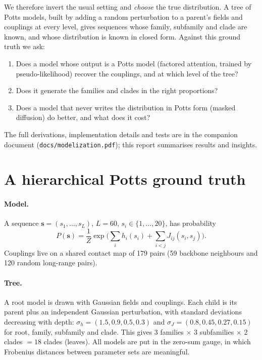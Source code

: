 \documentclass[10pt,a4paper,twocolumn]{article}
\begin{document}
We therefore invert the usual setting and \emph{choose} the true distribution. A tree of Potts models, built by
adding a random perturbation to a parent's fields and couplings at every level, gives sequences whose family,
subfamily and clade are known, and whose distribution is known in closed form. Against this ground truth we
ask:
\begin{enumerate}
\item Does a model whose output is a Potts model (factored attention, trained by pseudo-likelihood) recover the
couplings, and at which level of the tree?
\item Does it generate the families and clades in the right proportions?
\item Does a model that never writes the distribution in Potts form (masked diffusion) do better, and what does it
cost?
\end{enumerate}
The full derivations, implementation details and tests are in the companion document
(\texttt{docs/modelization.pdf}); this report summarises results and insights.

\section{A hierarchical Potts ground truth}
\paragraph{Model.} A sequence $\bm s=(s_1,\dots,s_L)$, $L=60$, $s_i\in\{1,\dots,20\}$, has probability
\[
P(\bm s)=\frac1Z\exp\Big(\sum_ih_i(s_i)+\sum_{i<j}J_{ij}(s_i,s_j)\Big).
\]
Couplings live on a shared contact map of 179 pairs (59 backbone neighbours and 120 random long-range pairs).

\paragraph{Tree.} A root model is drawn with Gaussian fields and couplings. Each child is its parent plus an
independent Gaussian perturbation, with standard deviations decreasing with depth:
$\sigma_h=(1.5,0.9,0.5,0.3)$ and $\sigma_J=(0.8,0.45,0.27,0.15)$ for root, family, subfamily and clade. This gives
3 families $\times$ 3 subfamilies $\times$ 2 clades $=18$ clades (leaves). All models are put in the zero-sum gauge,
in which Frobenius distances between parameter sets are meaningful.
\end{document}
